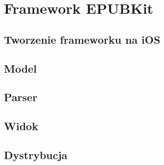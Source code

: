 \chapter{Framework EPUBKit}

\section{Tworzenie frameworku na iOS}

\section{Model}

\section{Parser}

\section{Widok}

\section{Dystrybucja}
